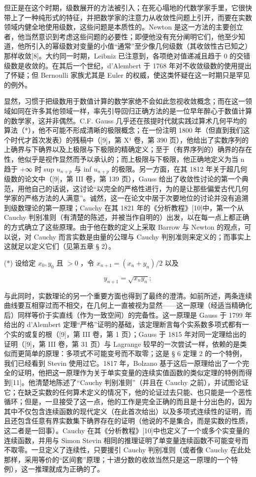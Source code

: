 但正是在这个时期，级数展开的方法被引入；在死心塌地的代数学家手里，它很快带上了一种纯形式的特征，并把数学家的注意力从收敛性问题上引开，而要在实数领域内健全地使用级数，这些问题是本质性的。Newton 是这一方法的主要创立者，他当然意识到考虑这些问题的必要性；即便他没有充分阐明它们，他至少知道，他所引入的幂级数对变量的小值“通常”至少像几何级数（其收敛性古已知之）那样收敛{[}8{]}。大约同一时期，Leibniz 已注意到，各项绝对值递减且趋于 0 的交错级数是收敛的。在其后一个世纪，d'Alembert 于 1768 年对不收敛级数的使用提出了怀疑；但 Bernoulli 家族尤其是 Euler 的权威，使这类怀疑在这一时期只是罕见的例外。

显然，习惯于把级数用于数值计算的数学家绝不会如此忽视收敛概念；而在这一领域如同在许多其他领域一样，率先引导回归正确方法的是一位早年醉心于数值计算的数学家，这并非偶然。C.F. Gauss 几乎还在孩提时代就实践过算术几何平均的算法（*），他不可能不形成清晰的极限概念；在一份注明 1800 年（但直到我们这个时代才首次发表）的残稿中（{[}9{]}，第 X¹ 卷，第 390 页），他给出了实数序列的上确界与下确界以及上极限与下极限的精确定义；至于（有界序列的）确界的存在性，他似乎是视作显然而予以承认的；而上极限与下极限，他正确地定义为当 n 趋于 +∞ 时 sup \(u_{n+p}\) 与 inf \(u_{n+p}\) 的极限。另一方面，在其 1812 年关于超几何级数的论文中（{[}9{]}，第 III 卷，第 139 页），Gauss 给出了收敛性讨论的第一个典范，用他自己的话说，这讨论“以完全的严格性进行，为的是让那些偏爱古代几何学家的严格方法的人满意”。诚然，这一在论文中居于次要地位的讨论并没有追溯到级数理论的第一原理；Cauchy 在其 1821 年的《分析教程》{[}10{]}中，第一个从 Cauchy 判别准则（有清楚的陈述，并被当作自明的）出发，以在每一点上都正确的方式确立了这些原理。由于他在数的定义上采取 Barrow 与 Newton 的观点，可以说，对 Cauchy 而言实数是由量的公理与 Cauchy 判别准则来定义的；而事实上这就足以定义它们（见第五章 § 2）。

(*) 设给定 \(x_0, y_0\) 且 \(> 0\) ，令 \(x_{n+1} = (x_n + y_n)/2\) 以及

\[
y _ {n + 1} = \sqrt {x _ {n} y _ {n}};
\]

与此同时，实数理论的另一个重要方面也得到了最终的澄清。如前所述，两条连续曲线要互相穿过而不相交，在几何上一直被视为显然——这一原理（经适当精确化后）同样等价于实直线（作为一致空间）的完备性。这一原理是 Gauss 于 1799 年给出的 d'Alembert 定理“严格”证明的基础，该定理断言每个实系数多项式都有一个实的或复的根（{[}9{]}，第 III 卷，第 1 页）；Gauss 于 1815 年对同一定理给出的证明（{[}9{]}，第 III 卷，第 31 页）与 Lagrange 较早的一次尝试一样，依赖的是类似而更简单的原理：多项式不可能变号而不取零；这是 § 6 定理 2 的一个特例，我们已经看到 Stevin 使用过它。1817 年，Bolzano 基于这后一原理给出了一个完全的证明，他把这一原理作为关于单实变量的连续实值函数的类似定理的特例而得到{[}11{]}。他清楚地陈述了“Cauchy 判别准则”（并且在 Cauchy 之前），并试图论证它；在缺乏实数的任何算术定义的情况下，他的论证过去只能、也只能是一个恶性循环；但是，一旦接受了这一点，他的工作是完全正确的而且是十分出色的，因为其中不仅包含连续函数的现代定义（在此首次给出）以及多项式连续性的证明，而且还包含任意有界实数集下确界存在的证明（他说的不是集合，而是实数的性质，这二者是一回事）。Cauchy 在其《分析教程》{[}10{]}中也定义了一个或多个实变量的连续函数，并用与 Simon Stevin 相同的推理证明了单变量连续函数不可能变号而不取零。一旦定义了连续性，只要援引 Cauchy 判别准则（或者像 Cauchy 在此处那样，采用等价的“区间套”原理；十进分数的收敛当然只是这一原理的一个特例），这一推理就成为正确的了。

